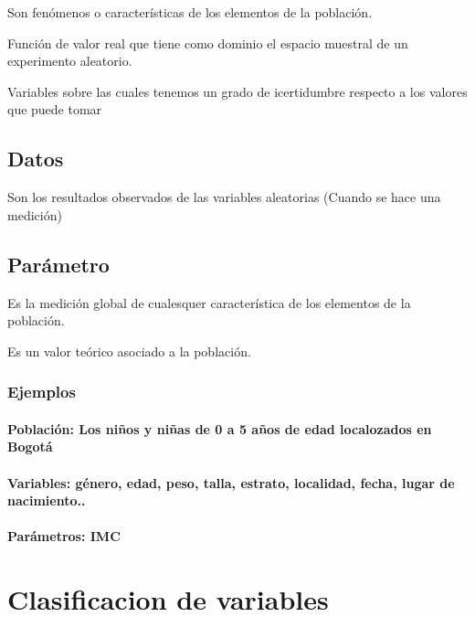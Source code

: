 \documentclass[twocolumn]{article}
\let\oldparagraph\paragraph
\renewcommand{\paragraph}[1]{\oldparagraph{#1}\mbox{}}
\begin{document}
Son fenómenos o características de los elementos de la población.

Función de valor real que tiene como dominio el espacio muestral de un
experimento aleatorio.

Variables sobre las cuales tenemos un grado de icertidumbre respecto a
los valores que puede tomar

\subsection{Datos}\label{datos}

Son los resultados observados de las variables aleatorias (Cuando se
hace una medición)

\subsection{Parámetro}\label{paruxe1metro}

Es la medición global de cualesquer característica de los elementos de
la población.

Es un valor teórico asociado a la población.

\subsubsection{Ejemplos}\label{ejemplos}

\paragraph{Población: Los niños y niñas de 0 a 5 años de edad
localozados en
Bogotá}\label{poblaciuxf3n-los-niuxf1os-y-niuxf1as-de-0-a-5-auxf1os-de-edad-localozados-en-bogotuxe1}

\paragraph{Variables: género, edad, peso, talla, estrato, localidad,
fecha, lugar de
nacimiento..}\label{variables-guxe9nero-edad-peso-talla-estrato-localidad-fecha-lugar-de-nacimiento..}

\paragraph{Parámetros: IMC}\label{paruxe1metros-imc}

\section{Clasificacion de variables}\label{clasificacion-de-variables}
\end{document}

